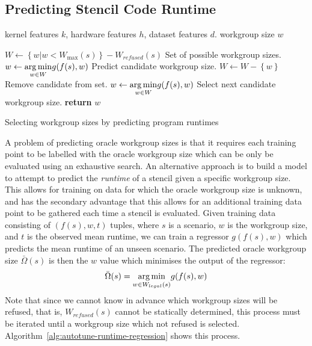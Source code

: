 \subsection{Predicting Stencil Code Runtime}\label{subsec:omnitune-ml-runtime}

\begin{algorithm}
  \begin{algorithmic}[1]
    \Require kernel features $k$, hardware features $h$, dataset features
    $d$.
    \Ensure workgroup size $w$

    \State $W \leftarrow \left\{ w | w < W_{\max}(s) \right\} - W_{refused}(s)$
    \Comment Set of possible workgroup sizes.
    \State $w \leftarrow \underset{w \in W}{\operatorname*{arg\,min}} g(f(s), w)$
    \Comment Predict candidate workgroup size.
    \State $W \leftarrow W - \left\{ w \right\}$
    \Comment Remove candidate from set.
    \State $w \leftarrow \underset{w \in W}{\operatorname*{arg\,min}} g(f(s), w)$
    \Comment Select next candidate workgroup size.
    \EndWhile
    \State \textbf{return} $w$
  \end{algorithmic}
  \caption{Selecting workgroup sizes by predicting program runtimes}
  \label{alg:autotune-runtime-regression}
\end{algorithm}

A problem of predicting oracle workgroup sizes is that it requires
each training point to be labelled with the oracle workgroup size
which can be only be evaluated using an exhaustive search. An
alternative approach is to build a model to attempt to predict the
\emph{runtime} of a stencil given a specific workgroup size. This
allows for training on data for which the oracle workgroup size is
unknown, and has the secondary advantage that this allows for an
additional training data point to be gathered each time a stencil is
evaluated. Given training data consisting of $(f(s),w,t)$ tuples,
where $s$ is a scenario, $w$ is the workgroup size, and $t$ is the
observed mean runtime, we can train a regressor $g(f(s), w)$ which
predicts the mean runtime of an unseen scenario. The predicted oracle
workgroup size $\bar{\Omega}(s)$ is then the $w$ value which minimises
the output of the regressor:
%
\begin{equation}
  \bar{\Omega}(s) = \underset{w \in W_{legal}(s)}{\operatorname*{arg\,min}} g(f(s), w)
\end{equation}
%
Note that since we cannot know in advance which workgroup sizes will
be refused, that is, $W_{refused}(s)$ cannot be statically determined,
this process must be iterated until a workgroup size which not refused
is selected. Algorithm~\ref{alg:autotune-runtime-regression} shows
this process.


